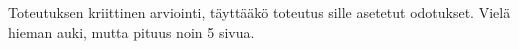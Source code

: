 Toteutuksen kriittinen arviointi, täyttääkö toteutus sille asetetut odotukset. Vielä hieman auki, mutta pituus noin 5 sivua.
